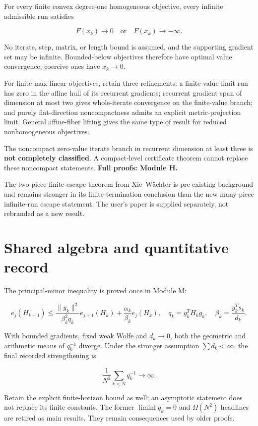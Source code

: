For every finite convex degree-one homogeneous objective, every infinite admissible run satisfies

\[F(x_k)\to0\quad\text{or}\quad F(x_k)\to-\infty.\]

No iterate, step, matrix, or length bound is assumed, and the supporting gradient set may be infinite. Bounded-below objectives therefore have optimal value convergence; coercive ones have \(x_k\to0\).

For finite max-linear objectives, retain three refinements: a finite-value-limit run has zero in the affine hull of its recurrent gradients; recurrent gradient span of dimension at most two gives whole-iterate convergence on the finite-value branch; and purely flat-direction noncompactness admits an explicit metric-projection limit. General affine-fiber lifting gives the same type of result for reduced nonhomogeneous objectives.

The noncompact zero-value iterate branch in recurrent dimension at least three is \textbf{not completely classified}. A compact-level certificate theorem cannot replace these noncompact statements. \textbf{Full proofs: Module H.}

The two-piece finite-escape theorem from Xie--Wächter is pre-existing background and remains stronger in its finite-termination conclusion than the new many-piece infinite-run escape statement. The user's paper is supplied separately, not rebranded as a new result.

\section{Shared algebra and quantitative record}\label{shared-algebra-and-quantitative-record}

The principal-minor inequality is proved once in Module M:

\[e_j(H_{k+1})\le
\frac{\|y_k\|^2}{\beta_k^2q_k}e_{j+1}(H_k)
+\frac{\alpha_k}{\beta_k}e_j(H_k),\quad
q_k=g_k^TH_kg_k,\quad\beta_k=\frac{y_k^Ts_k}{d_k}.\]

With bounded gradients, fixed weak Wolfe and \(d_k\to0\), both the geometric and arithmetic means of \(q_k^{-1}\) diverge. Under the stronger assumption \(\sum d_k<\infty\), the final recorded strengthening is

\[\boxed{\frac1{N^2}\sum_{k<N}q_k^{-1}\to\infty.}\]

Retain the explicit finite-horizon bound as well; an asymptotic statement does not replace its finite constants. The former \(\liminf q_k=0\) and \(\Omega(N^2)\) headlines are retired as main results. They remain consequences used by older proofs.

